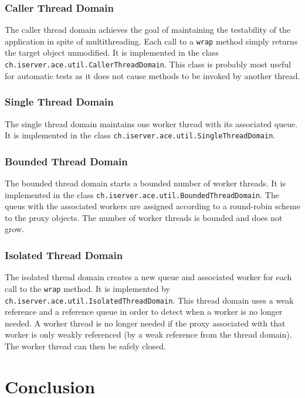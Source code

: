 \subsubsection{Caller Thread Domain}
The caller thread domain achieves the goal of maintaining the testability
of the application in spite of multithreading. Each call to a
\texttt{wrap} method simply returns the target object unmodified. It
is implemented in the class \texttt{ch.iserver.ace.util.CallerThreadDomain}.
This class is probably most useful for automatic tests as it does not cause
methods to be invoked by another thread.

\subsubsection{Single Thread Domain}
The single thread domain maintains one worker thread with its associated
queue. It is implemented in the class
\texttt{ch.iserver.ace.util.SingleThreadDomain}.


\subsubsection{Bounded Thread Domain}
The bounded thread domain starts a bounded number of worker threads. It
is implemented in the class \texttt{ch.iserver.ace.util.BoundedThreadDomain}.
The queus with the associated workers are assigned according to
a round-robin scheme to the proxy objects. The number of worker threads
is bounded and does not grow.


\subsubsection{Isolated Thread Domain}
The isolated thread domain creates a new queue and associated worker
for each call to the \texttt{wrap} method. It is implemented by
\texttt{ch.iserver.ace.util.IsolatedThreadDomain}. This thread domain
uses a weak reference and a reference queue in order to detect when
a worker is no longer needed. A worker thread is no longer needed if the
proxy associated with that worker is only weakly referenced (by a weak
reference from the thread domain). The worker thread can then be
safely closed.



\section{Conclusion}

